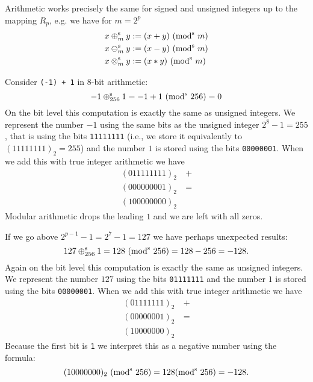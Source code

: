 Arithmetic works precisely the same for signed and unsigned integers up to the mapping $R_p$, e.g. we have for $m = 2^p$
\begin{align*}
x \ensuremath{\oplus}_{m}^{\rm s} y &:= (x+y)\ ({\rm mod}^{\rm s}\ m) \\
x \ensuremath{\ominus}_{m}^{\rm s} y &:= (x-y)\ ({\rm mod}^{\rm s}\ m) \\
x \ensuremath{\otimes}_{m}^{\rm s} y &:= (x*y)\ ({\rm mod}^{\rm s}\ m)
\end{align*}
\begin{example} Consider \texttt{(-1) + 1} in 8-bit arithmetic:
\[
-1 \ensuremath{\oplus}_{256}^{\rm s} 1 = -1 + 1 \ ({\rm mod}^{\rm s}\ 256) = 0
\]
On the bit level this computation is exactly the same as unsigned integers. We represent the number $-1$ using the same bits as the unsigned integer $2^8 - 1 = 255$, that is  using the bits \texttt{11111111} (i.e., we store it equivalently to  $(11111111)_2 = 255$) and the  number $1$ is stored using the bits \texttt{00000001}. When we add this with true integer arithmetic we have
\begin{align*}
(0 11111111)_2 &\ + \\
(0 00000001)_2 &\ = \\
(1 00000000)_2&
\end{align*}
Modular arithmetic drops the leading $1$ and we are left with all zeros. \end{example}

\begin{example} If we go above $2^{p-1}-1 = 2^7 - 1 = 127$  we have perhaps unexpected results:
\[
127 \ensuremath{\oplus}_{256}^{\rm s} 1 = 128\  ({\rm mod}^{\rm s}\ 256) = 128 - 256 = -128.
\]
Again on the bit level this computation is exactly the same as unsigned integers. We represent the number $127$ using the bits \texttt{01111111} and the  number $1$ is stored using the bits \texttt{00000001}. When we add this with true integer arithmetic we have
\begin{align*}
(01111111)_2 &\ + \\
(00000001)_2 &\ = \\
(10000000)_2&
\end{align*}
Because the first bit is \texttt{1} we interpret this as a negative number using the formula:
\[
(10000000)_2\ ({\rm mod}^{\rm s}\ 256) = 128   ({\rm mod}^{\rm s}\ 256) = -128.
\]
\end{example}

